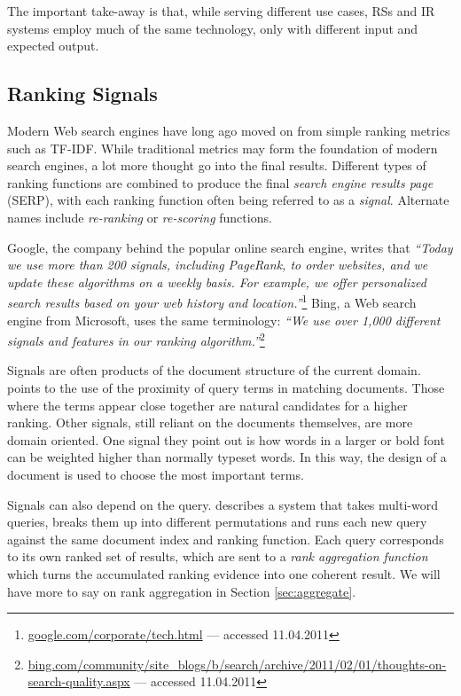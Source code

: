 The important take-away is that, while serving different use cases, RSs and IR systems 
employ much of the same technology, only with different input and expected output.


\subsection{Ranking Signals}
\label{subsec:signals}

Modern Web search engines have long ago moved on from simple ranking metrics such as TF-IDF.
While traditional metrics may form the foundation of modern search engines, a lot more thought go into the final results.
Different types of ranking functions are combined to produce the final \emph{search engine results page} (SERP),
with each ranking function often being referred to as a \emph{signal}. Alternate names include
\emph{re-ranking} or \emph{re-scoring} functions.

Google, the company behind the popular online search engine, writes that \emph{``Today we use more than 200 signals, including PageRank, 
to order websites, and we update these algorithms on a weekly basis.
For example, we offer personalized search results based on your web history and 
location.''}\footnote{\url{google.com/corporate/tech.html} --- accessed 11.04.2011}
Bing, a Web search engine from Microsoft, uses the same terminology:
\emph{``We use over 1,000 different signals and features in our ranking 
algorithm.''}\footnote{\url{bing.com/community/site_blogs/b/search/archive/2011/02/01/thoughts-on-search-quality.aspx} --- accessed 11.04.2011}

Signals are often products of the document structure of the current domain.
\citet[p5]{Bender2005} points to the use of the proximity of query terms in matching documents.
Those where the terms appear close together are natural candidates for a higher ranking.
Other signals, still reliant on the documents themselves, are more domain oriented.
One signal they point out is how words in a larger or bold font can be weighted 
higher than normally typeset words.
In this way, the design of a document is used to choose the most important terms. 

Signals can also depend on the query. \citet[p145]{Manning2008} describes a system that takes
multi-word queries, breaks them up into different permutations and runs each new query against the same
document index and ranking function. Each query corresponds to its own ranked set of results,
which are sent to a \emph{rank aggregation function} which turns the accumulated ranking evidence
into one coherent result. We will have more to say on rank aggregation in Section \ref{sec:aggregate}.  

